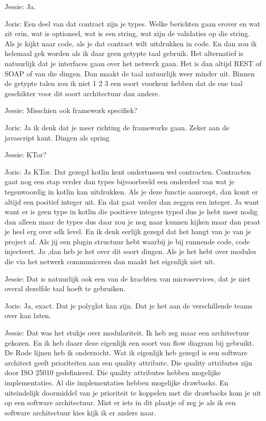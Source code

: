 Jessie: Ja.

Joris: Een deel van dat contract zijn je types. Welke berichten gaan erover en wat zit erin, wat is optioneel, wat is een string, wat zijn de validaties op die string. Als je kijkt naar code, als je dat contract wilt uitdrukken in code. En dan zou ik helemaal gek worden als ik daar geen getypte taal gebruik. Het alternatief is natuurlijk dat je interfaces gaan over het netwerk gaan. Het is dan altijd REST of SOAP of van die dingen. Dan maakt de taal natuurlijk weer minder uit. Binnen de getypte talen zou ik niet 1 2 3 een soort voorkeur hebben dat de ene taal geschikter voor dit soort architectuur dan andere.

Jessie: Misschien ook framework specifiek?

Joris: Ja ik denk dat je meer richting de frameworks gaan. Zeker aan de javascript kant. Dingen als spring

Jessie: KTor?

Joris: Ja KTor. Dat gezegd kotlin kent ondertussen wel contracten. Contracten gaat nog een stap verder dan types bijvoorbeeld een onderdeel van wat je tegenwoordig in kotlin kan uitdrukken. Als je deze functie aanroept, dan komt er altijd een positief integer uit. En dat gaat verder dan zeggen een integer. Ja want want er is geen type in kotlin die positieve integers typed dus je hebt meer nodig dan alleen maar de types dus daar zou je nog naar kunnen kijken maar dan praat je heel erg over sdk level. En ik denk eerlijk gezegd dat het hangt van je van je project af. Als jij een plugin structuur hebt waarbij je bij runnende code, code injecteert. Ja ,dan heb je het over dit soort dingen. Als je het hebt over modules die via het netwerk communiceren dan maakt het eigenlijk niet uit.

Jessie: Dat is natuurlijk ook een van de krachten van microservices, dat je niet overal dezelfde taal hoeft te gebruiken.

Joris: Ja, exact. Dat je polyglot kan zijn. Dat je het aan de verschillende teams over kan laten.

Jessie: Dat was het stukje over modulariteit. Ik heb zeg maar een architectuur gekozen. En ik heb daarr deze eigenlijk een soort van flow diagram bij gebruikt. De Rode lijnen heb ik onderzocht. Wat ik eigenlijk heb gezegd is een software architect geeft prioriteiten aan een quality attribute. Die quality attributes zijn door ISO 25010 gedefinieerd. Die quality attributes hebben mogelijke implementaties. Al die implementaties hebben mogelijke drawbacks. En uiteindelijk doormiddel van je prioriteit te koppelen met die drawbacks kom je uit op een software architectuur. Mist er iets in dit plaatje of zeg je als ik een software architectuur kies kijk ik er anders naar.

